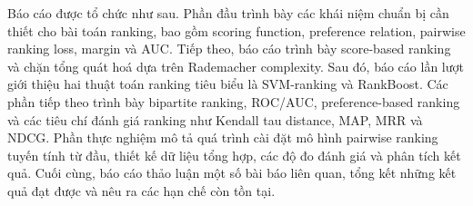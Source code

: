 Báo cáo được tổ chức như sau. Phần đầu trình bày các khái niệm chuẩn bị cần thiết cho bài toán ranking, bao gồm scoring function, preference relation, pairwise ranking loss, margin và AUC. Tiếp theo, báo cáo trình bày score-based ranking và chặn tổng quát hoá dựa trên Rademacher complexity. Sau đó, báo cáo lần lượt giới thiệu hai thuật toán ranking tiêu biểu là SVM-ranking và RankBoost. Các phần tiếp theo trình bày bipartite ranking, ROC/AUC, preference-based ranking và các tiêu chí đánh giá ranking như Kendall tau distance, MAP, MRR và NDCG. Phần thực nghiệm mô tả quá trình cài đặt mô hình pairwise ranking tuyến tính từ đầu, thiết kế dữ liệu tổng hợp, các độ đo đánh giá và phân tích kết quả. Cuối cùng, báo cáo thảo luận một số bài báo liên quan, tổng kết những kết quả đạt được và nêu ra các hạn chế còn tồn tại.